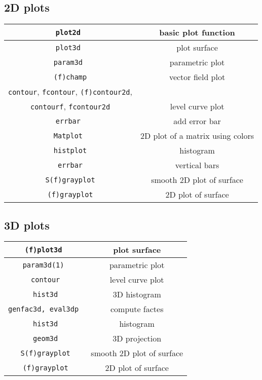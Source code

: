 \subsection{2D plots}
\begin{center}
\begin{tabular}{|c|c|}
\hline
{\tt plot2d }  & basic plot function \\ \hline
{\tt plot3d } & plot surface \\ \hline
{\tt param3d } &  parametric plot \\ \hline
{\tt (f)champ} & vector field plot \\ \hline
{\tt contour}, {\tt fcontour}, {\tt (f)contour2d}, \\
{\tt contourf}, {\tt fcontour2d} & level curve plot \\ \hline
{\tt errbar  }  & add error bar \\ \hline
{\tt Matplot }  & 2D plot of a matrix using colors \\ \hline
{\tt histplot}  & histogram \\ \hline
{\tt errbar}  & vertical bars \\ \hline
{\tt S(f)grayplot}  & smooth 2D plot of surface \\ \hline
{\tt (f)grayplot}  & 2D plot of surface \\ \hline
\end{tabular}
\end{center}

\subsection{3D plots}
\begin{center}
\begin{tabular}{|c|c|}
\hline
{\tt (f)plot3d } & plot surface \\ \hline
{\tt param3d(1) } &  parametric plot \\ \hline
{\tt contour} & level curve plot \\ \hline
{\tt hist3d}  & 3D histogram\\ \hline
{\tt genfac3d, eval3dp }  & compute factes \\ \hline
{\tt hist3d}  & histogram \\ \hline
{\tt geom3d}  & 3D projection \\ \hline
{\tt S(f)grayplot}  & smooth 2D plot of surface \\ \hline
{\tt (f)grayplot}  & 2D plot of surface \\ \hline
\end{tabular}
\end{center}

